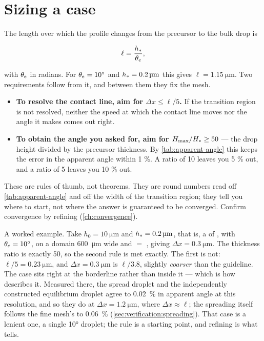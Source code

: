 \section{Sizing a case}
\label{sec:wetting:sizing}

The length over which the profile changes from the precursor to the bulk drop
is

\begin{equation}\label{eq:transition-length}
  \ell = \frac{h_{*}}{\theta_{e}},
\end{equation}

with $\theta_{e}$ in radians. For $\theta_{e} = 10^\circ$ and
$h_{*} = \SI{0.2}{\micro\metre}$ this gives $\ell = \SI{1.15}{\micro\metre}$.
Two requirements follow from it, and between them they fix the mesh.

\begin{tip}
  \begin{itemize}
    \item \textbf{To resolve the contact line, aim for $\Delta x \le \ell/5$.}
      If the transition region is not resolved, neither the speed at which the
      contact line moves nor the angle it makes comes out right.
    \item \textbf{To obtain the angle you asked for, aim for
      $H_{\mathrm{max}}/H_{*} \ge 50$} --- the drop height divided by the precursor
      thickness. By \cref{tab:apparent-angle} this keeps the error in the
      apparent angle within 1 \%. A ratio of 10 leaves you 5 \% out, and a
      ratio of 5 leaves you 10 \% out.
  \end{itemize}
  These are rules of thumb, not theorems. They are round numbers read off
  \cref{tab:apparent-angle} and off the width of the transition region; they
  tell you where to start, not where the answer is guaranteed to be converged.
  Confirm convergence by refining (\cref{ch:convergence}).
\end{tip}

A worked example. Take $h_0 = \SI{10}{\micro\metre}$ and
$h_{*} = \SI{0.2}{\micro\metre}$, that is, a  of
, with $\theta_{e} = 10^\circ$, on a domain \SI{600}{\micro\metre} wide
and  $=$ , giving $\Delta x = \SI{0.3}{\micro\metre}$. The
thickness ratio is exactly 50, so the second rule is met exactly. The first is
not: $\ell/5 = \SI{0.23}{\micro\metre}$, and $\Delta x = \SI{0.3}{\micro\metre}$
is $\ell/3.8$, slightly \emph{coarser} than the guideline. The case sits right
at the borderline rather than inside it --- which is how
 describes it. Measured there, the spread droplet
and the independently constructed equilibrium droplet agree to
\SI{0.02}{\percent} in apparent angle at this resolution, and so they do at
$\Delta x = \SI{1.2}{\micro\metre}$, where $\Delta x \approx \ell$; the spreading
itself follows the fine mesh's to \SI{0.06}{\percent}
(\cref{sec:verification:spreading}). That case is a lenient one, a single
\ang{10} droplet; the rule is a starting point, and refining is what tells.

